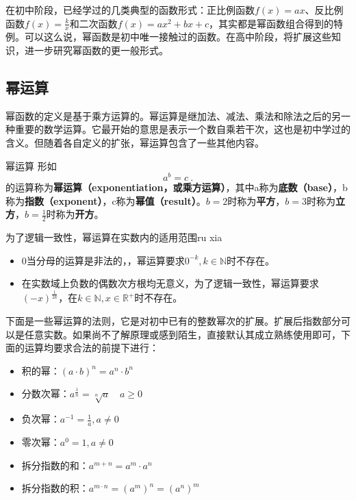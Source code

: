 


在初中阶段，已经学过的几类典型的函数形式：正比例函数$f(x) = ax$、反比例函数$\displaystyle f(x) = \frac{k}{x}$和二次函数$f(x) = ax^2+bx+c$，其实都是幂函数组合得到的特例。可以这么说，幂函数是初中唯一接触过的函数。在高中阶段，将扩展这些知识，进一步研究幂函数的更一般形式。

\subsection{幂运算}

幂函数的定义是基于乘方运算的。幂运算是继加法、减法、乘法和除法之后的另一种重要的数学运算。它最开始的意思是表示一个数自乘若干次，这也是初中学过的含义。但随着各自定义的扩张，幂运算包含了一些其他内容。

\begin{definition}{幂运算}\label{def_power_1}
形如
\begin{equation}
a^b=c~.
\end{equation}
的运算称为\textbf{幂运算（exponentiation，或乘方运算）}，其中a称为\textbf{底数（base）}，b称为\textbf{指数（exponent）}，c称为\textbf{幂值（result）}。$b=2$时称为\textbf{平方}，$b=3$时称为\textbf{立方}，$\displaystyle b=\frac{1}{2}$时称为\textbf{开方}。
\end{definition}

为了逻辑一致性，幂运算在实数内的适用范围ru xia
\begin{itemize}
\item $0$当分母的运算是非法的，，幂运算要求$0^{-k},k\in \mathbb{N}$时不存在。
\item 在实数域上负数的偶数次方根均无意义，为了逻辑一致性，幂运算要求$\displaystyle(-x)^\frac{1}{2k}$，在$k\in \mathbb{N},x\in\mathbb{R}^+$时不存在。
\end{itemize}


下面是一些幂运算的法则，它是对初中已有的整数幂次的扩展。扩展后指数部分可以是任意实数。如果尚不了解原理或感到陌生，直接默认其成立熟练使用即可，下面的运算均要求合法的前提下进行：
\begin{itemize}
\item 积的幂：$(a \cdot b)^n = a^n \cdot b^n$
\item 分数次幂：$a^{\frac{1}{n}} = \sqrt[n]{a} \quad a \geq 0$
\item 负次幂：$\displaystyle a^{-1}=\frac{1}{a},a\neq0$
\item 零次幂：$a^0=1,a\neq0$
\item 拆分指数的和：$a^{m+n}=a^m \cdot a^n$
\item 拆分指数的积：$a^{m \cdot n}= (a^m)^n =(a^n)^m $
\end{itemize}

